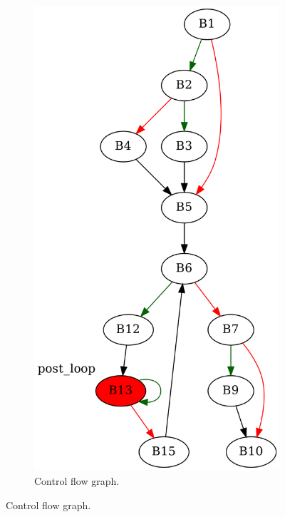\documentclass[aspectratio=1610]{beamer}
\begin{document}
\begin{frame}[noframenumbering]
\begin{figure}[htbp]
\begin{subfigure}[b]{0.50\textwidth}
			\includegraphics[height=0.6\paperheight]{inc/methods/interval/example/sample/f_0002a.png}
			\caption{Control flow graph.}
		\end{subfigure}
	\end{figure}
\end{frame}
\end{document}
